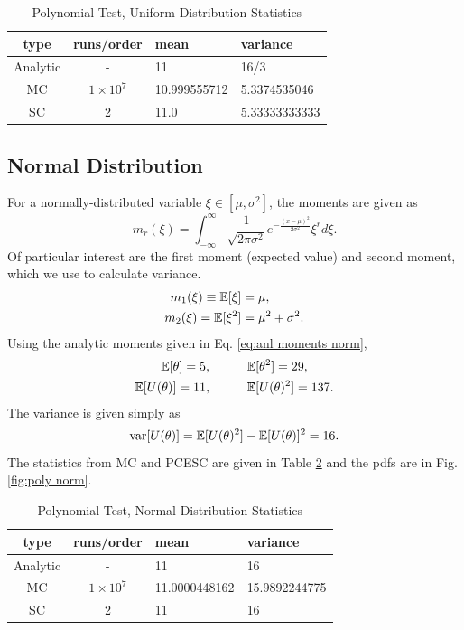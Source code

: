 \begin{table}
\begin{center}
\begin{tabular}{c c|l l}
type & runs/order & mean & variance \\ \hline
Analytic & - & 11 & 16/3 \\
MC & $1\times10^7$ & 10.999555712 & 5.3374535046 \\
SC & 2 & 11.0 & 5.33333333333 \\
\end{tabular}
\end{center}
\caption{Polynomial Test, Uniform Distribution Statistics}
\label{tab:poly uniform}
\end{table}

\subsection{Normal Distribution}
For a normally-distributed variable $\xi\in[\mu,\sigma^2]$, the moments are given as
\begin{equation}
m_r(\xi)=\int_{-\infty}^\infty \frac{1}{\sqrt{2\pi\sigma^2}}e^{-\frac{(x-\mu)^2}{2\sigma^2}}\xi^r d\xi.
\end{equation}
Of particular interest are the first moment (expected value) and second moment, which we use to calculate variance.
\begin{align}\label{eq:anl moments norm}
m_1(\xi)\equiv\mathbb{E}[ \xi]&=\mu,\\
m_2(\xi)=\mathbb{E}[ \xi^2]&=\mu^2+\sigma^2.
\end{align}
Using the analytic moments given in Eq. \ref{eq:anl moments norm},
\begin{align}
\mathbb{E}[ \theta] = 5, &\hspace{30pt}\mathbb{E}[ \theta^2]=29,\\
\mathbb{E}[ U(\theta)]=11, &\hspace{30pt}\mathbb{E}[ U(\theta)^2]=137.
\end{align}
The variance is given simply as
\begin{equation}
\text{var}[U(\theta)]=\mathbb{E}[ U(\theta)^2]-\mathbb{E}[ U(\theta)]^2=16.
\end{equation}
The statistics from MC and PCESC are given in Table \ref{tab:poly normal} and the pdfs are in Fig. \ref{fig:poly norm}.

\begin{table}
\begin{center}
\begin{tabular}{c c|l l}
type & runs/order & mean & variance \\ \hline
Analytic & - & 11 & 16 \\
MC & $1\times10^7$ & 11.0000448162 & 15.9892244775 \\
SC & 2 & 11 & 16 \\
\end{tabular}
\end{center}
\caption{Polynomial Test, Normal Distribution Statistics}
\label{tab:poly normal}
\end{table}

